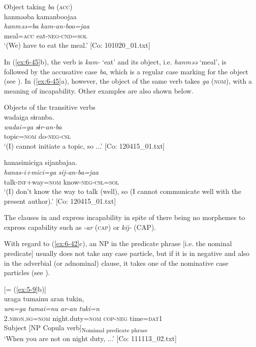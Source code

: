 \ex Object taking \textit{ba} (\textsc{acc})\\
{\TM}
\glll  hanməəba  kamanboojaa\\
\textit{hanməə=ba}  \textit{kam-an-boo=jaa}\\
meal=\textsc{acc}  eat-\textsc{neg}-\textsc{cnd}=\textsc{sol}\\
\glt ‘(We) have to eat the meal.’ [Co: 101020\_01.txt]
\z
\z

In (\ref{ex:6-45}b), the verb is \textit{kam-} ‘eat’ and its object, i.e. \textit{hanməə} ‘meal’, is followed by the accusative case \textit{ba}, which is a regular case marking for the object (see ). In (\ref{ex:6-45}a), however, the object of the same verb takes \textit{ga} (\textsc{nom}), with a meaning of incapability. Other examples are also shown below.

\ea\label{ex:6-46}
 Objects of the transitive verbs\\

 \ea {\TM}  {\textbar}wadai{\textbar}ga  sɨranba.\\
\glll \textit{wadai=ga}  \textit{sɨr-an-ba}\\
topic=\textsc{nom}  do-\textsc{neg}-\textsc{csl}\\
\glt ‘(I) cannot initiate a topic, so ...’ [Co: 120415\_01.txt]
\z

\ex {\TM}  hanasimiciga  sijanbajaa.\\
\glll \textit{hanas-i+mici=ga}  \textit{sij-an-ba=jaa}\\
talk-\textsc{inf}+way=\textsc{nom}  know-\textsc{neg}-\textsc{csl}=\textsc{sol}\\
\glt ‘(I) don’t know the way to talk (well), so (I cannot communicate well with the present author).’ [Co: 120415\_01.txt]
\z
\z

The clauses in  and  express incapability in spite of there being no morphemes to express capability such as \textit{-ar} (\textsc{cap}) or \textit{kij-} (CAP).

  With regard to (\ref{ex:6-42}c), an NP in the predicate phrase [i.e. the nominal predicate] usually does not take any case particle, but if it is in negative and also in the adverbial (or adnominal) clause, it takes one of the nominative case particles (see ).

\ea\label{ex:6-47}
 [= (\ref{ex:5-9}b)]\\
{\TM}
\gllll uraga  tumainu  aran  tukin,\\
\textit{ura=ga}  \textit{tumai=nu}  \textit{ar-an}  \textit{tuki=n}\\
    2.\textsc{nhon}.\textsc{sg}=\textsc{nom}  night.duty=\textsc{nom}  \textsc{cop}-\textsc{neg}  time=\textsc{dat}1\\
    Subject  [NP  Copula verb]\textsubscript{Nomimal predicate phrase}  \\
\glt    ‘When you are not on night duty, ...’ [Co: 111113\_02.txt]
\z

